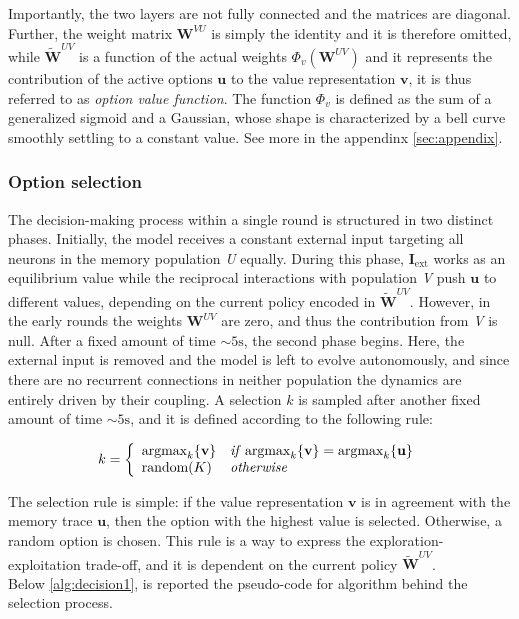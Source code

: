 \noindent Importantly, the two layers are not fully connected and the matrices are diagonal. Further, the weight matrix $\textbf{W}^{VU}$ is simply the identity and it is therefore omitted, while $\tilde{\textbf{W}}^{UV}$ is a function of the actual weights $\Phi_{v}(\textbf{W}^{UV})$ and it represents the contribution of the
active options $\textbf{u}$ to the value representation $\textbf{v}$, it is thus referred to as \textit{option value function}.
The function $\Phi_{v}$ is defined as the sum of a generalized sigmoid and a Gaussian, whose shape is characterized by a bell curve smoothly settling to a constant value. See more in the appendinx \ref{sec:appendix}.

\subsubsection{Option selection}
The decision-making process within a single round is structured in two distinct phases. Initially, the model receives a constant external input targeting all neurons in the memory population \textit{U} equally.
During this phase, $\textbf{I}_{\text{ext}}$ works as an equilibrium value while the reciprocal interactions with population \textit{V} push $\textbf{u}$ to different values, depending on the current policy encoded in $\tilde{\textbf{W}}^{UV}$. However, in the early rounds the weights $\textbf{W}^{UV}$ are zero, and thus
the contribution from \textit{V} is null. After a fixed amount of time $\sim 5 \text{s}$, the second phase begins. Here, the external input is removed and the model is left to evolve autonomously, and since there are no recurrent connections in neither population the dynamics are entirely driven by their coupling. A selection $k$ is sampled after another fixed amount of time $\sim 5 \text{s}$, and it is defined according to the following rule:

\begin{equation*}
    k =
    \left\{
        \begin{array}{ll}
            \text{argmax}_{k}\{\textbf{v}\} & \text{\textit{if}}\; \text{argmax}_{k} \{\textbf{v}\} = \text{argmax}_{k} \{\textbf{u}\} \\
            \text{random}(K) & \text{\textit{otherwise}}
        \end{array}
    \right.
\end{equation*}

\noindent The selection rule is simple: if the value representation $\textbf{v}$ is in agreement with the memory trace $\textbf{u}$, then the option with the highest value is selected. Otherwise, a random option is chosen. This rule is a way to express the exploration-exploitation trade-off, and it
is dependent on the current policy $\tilde{\textbf{W}}^{UV}$. \\ Below \ref{alg:decision1}, is reported the pseudo-code for algorithm behind the selection process.

